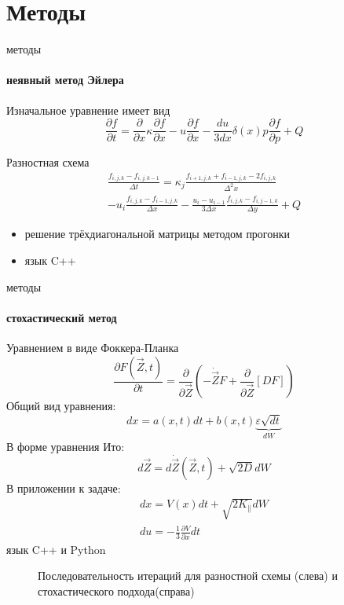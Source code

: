 \documentclass[8pt,pdf,hyperref={unicode},serif]{beamer}
\begin{document}
\section{Методы}
\begin{frame}{методы}
\framesubtitle{неявный метод Эйлера}
Изначальное уравнение имеет вид
\begin{equation}
\frac{\partial f}{\partial t} = \frac{\partial}{\partial x} \kappa \frac{\partial f}{\partial x} - u \frac{\partial f}{\partial x} - \frac{du}{3dx} \delta(x) p \frac{\partial f}{\partial p} +Q
\end{equation}

\pause
Разностная схема
\begin{multline}
\frac{f_{i,j,k} - f_{i,j,k-1}}{\Delta t} = \kappa_{j} \frac{f_{i+1,j,k}+f_{i-1,j,k}-2f_{i,j,k}}{\Delta^2 x} \\
- u_i\frac{f_{i,j,k}-f_{i-1,j,k}}{\Delta x}-\frac{u_i-u_{i-1}}{3\Delta x}\frac{f_{i,j,k}-f_{i,j-1,k}}{\Delta y} + Q
\end{multline}
\pause
\begin{itemize}
\item решение трёхдиагональной матрицы методом прогонки
\item язык C++
\end{itemize}
\end{frame}

\begin{frame}{методы}
\framesubtitle{стохастический метод}
Уравнением в виде Фоккера-Планка
\begin{equation}
\frac{\partial F(\vec{Z}, t)}{\partial t} = \frac{\partial}{\partial \vec{Z}}\left( -\dot{\vec{Z}}F+\frac{\partial}{\partial\vec{Z}}[DF]  \right)
\end{equation}
\pause
Общий вид уравнения:
\begin{equation}
dx = a(x, t)dt + b(x,t) \underbrace{\varepsilon \sqrt{dt}}_{dW}
\end{equation}
\pause
В форме уравнения Ито:
\begin{equation}
d\vec{Z} = d\dot{\vec{Z}}(\vec{Z}, t)+\sqrt{2D}dW
\end{equation}
В приложении к задаче:
\begin{eqnarray}
dx = V(x)dt+\sqrt{2K_{\parallel}}dW\\
du = - \frac{1}{3} \frac{\partial V}{\partial x} dt
\end{eqnarray}
\pause
 язык C++ и Python
\end{frame}

\begin{frame}
\begin{figure}[H]
  \centering
  
  \caption{Последовательность итераций для разностной схемы (слева) и стохастического подхода(справа)}
\end{figure}
\end{frame}
\end{document}
